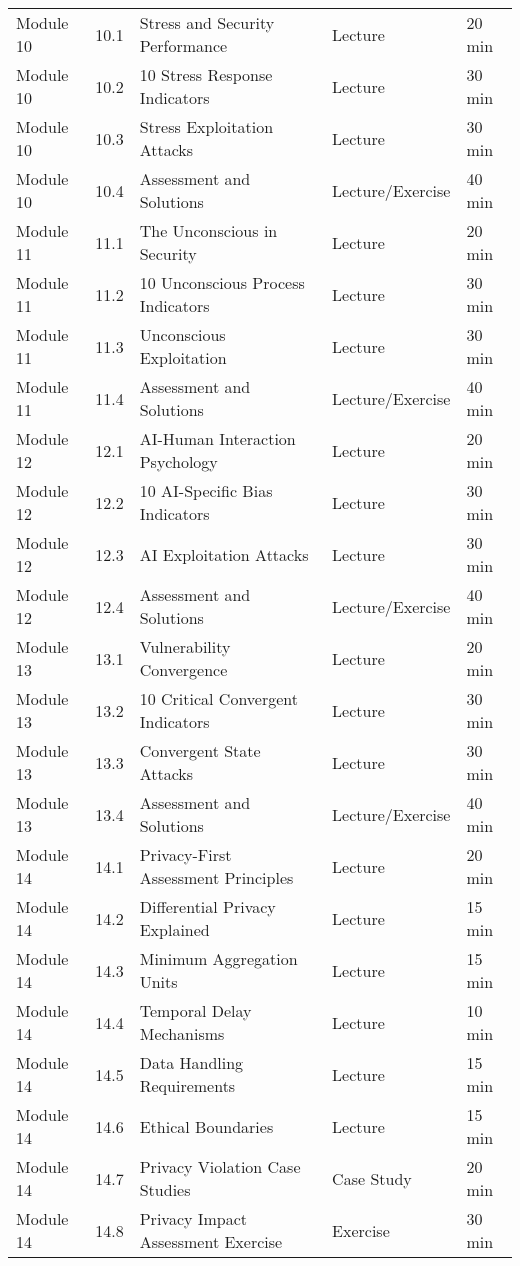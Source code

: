 \documentclass[11pt,a4paper]{article}
\begin{document}
\begin{longtable}{|p{2cm}|p{1cm}|p{7cm}|p{2cm}|p{1.5cm}|}
Module 10 & 10.1 & Stress and Security Performance & Lecture & 20 min \\
Module 10 & 10.2 & 10 Stress Response Indicators & Lecture & 30 min \\
Module 10 & 10.3 & Stress Exploitation Attacks & Lecture & 30 min \\
Module 10 & 10.4 & Assessment and Solutions & Lecture/Exercise & 40 min \\
\hline

Module 11 & 11.1 & The Unconscious in Security & Lecture & 20 min \\
Module 11 & 11.2 & 10 Unconscious Process Indicators & Lecture & 30 min \\
Module 11 & 11.3 & Unconscious Exploitation & Lecture & 30 min \\
Module 11 & 11.4 & Assessment and Solutions & Lecture/Exercise & 40 min \\
\hline

Module 12 & 12.1 & AI-Human Interaction Psychology & Lecture & 20 min \\
Module 12 & 12.2 & 10 AI-Specific Bias Indicators & Lecture & 30 min \\
Module 12 & 12.3 & AI Exploitation Attacks & Lecture & 30 min \\
Module 12 & 12.4 & Assessment and Solutions & Lecture/Exercise & 40 min \\
\hline

Module 13 & 13.1 & Vulnerability Convergence & Lecture & 20 min \\
Module 13 & 13.2 & 10 Critical Convergent Indicators & Lecture & 30 min \\
Module 13 & 13.3 & Convergent State Attacks & Lecture & 30 min \\
Module 13 & 13.4 & Assessment and Solutions & Lecture/Exercise & 40 min \\
\hline

Module 14 & 14.1 & Privacy-First Assessment Principles & Lecture & 20 min \\
Module 14 & 14.2 & Differential Privacy Explained & Lecture & 15 min \\
Module 14 & 14.3 & Minimum Aggregation Units & Lecture & 15 min \\
Module 14 & 14.4 & Temporal Delay Mechanisms & Lecture & 10 min \\
Module 14 & 14.5 & Data Handling Requirements & Lecture & 15 min \\
Module 14 & 14.6 & Ethical Boundaries & Lecture & 15 min \\
Module 14 & 14.7 & Privacy Violation Case Studies & Case Study & 20 min \\
Module 14 & 14.8 & Privacy Impact Assessment Exercise & Exercise & 30 min \\
\hline


\end{longtable}
\end{document}
